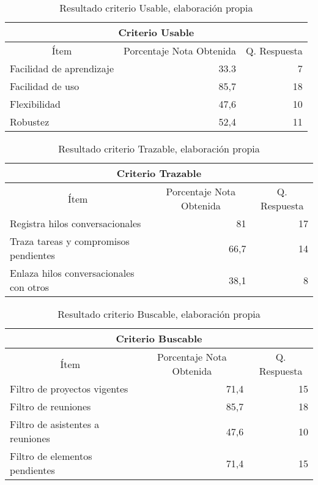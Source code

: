 \begin{table}[!h]
\centering
\caption{Resultado criterio Usable, elaboración propia}
\label{tab:usable}
\begin{tabular}{|l|r|r|}
\hline
\multicolumn{3}{|c|}{Criterio Usable} \\ \hline
\multicolumn{1}{|c|}{Ítem} & \multicolumn{1}{c|}{Porcentaje Nota Obtenida} & \multicolumn{1}{c|}{Q. Respuesta} \\ \hline
Facilidad de aprendizaje & 33.3 & 7 \\ \hline
Facilidad de uso & 85,7 & 18 \\ \hline
Flexibilidad & 47,6 & 10 \\ \hline
Robustez & 52,4 & 11 \\ \hline
\end{tabular}
\end{table}

\begin{table}[!h]
\centering
\caption{Resultado criterio Trazable, elaboración propia}
\label{tab:trazable}
\begin{tabular}{|l|r|r|}
\hline
\multicolumn{3}{|c|}{Criterio Trazable} \\ \hline
\multicolumn{1}{|c|}{Ítem} & \multicolumn{1}{c|}{Porcentaje Nota Obtenida} & \multicolumn{1}{c|}{Q. Respuesta} \\ \hline
Registra hilos conversacionales & 81 & 17 \\ \hline
Traza tareas y compromisos pendientes & 66,7 & 14 \\ \hline
Enlaza hilos conversacionales con otros & 38,1 & 8 \\ \hline
\end{tabular}
\end{table}

\begin{table}[!h]
\centering
\caption{Resultado criterio Buscable, elaboración propia}
\label{tab:buscable}
\begin{tabular}{|l|r|r|}
\hline
\multicolumn{3}{|c|}{Criterio Buscable} \\ \hline
\multicolumn{1}{|c|}{Ítem} & \multicolumn{1}{c|}{Porcentaje Nota Obtenida} & \multicolumn{1}{c|}{Q. Respuesta} \\ \hline
Filtro de proyectos vigentes & 71,4 & 15 \\ \hline
Filtro de reuniones & 85,7 & 18 \\ \hline
Filtro de asistentes a reuniones & 47,6 & 10 \\ \hline
Filtro de elementos pendientes & 71,4 & 15 \\ \hline
\end{tabular}
\end{table}

